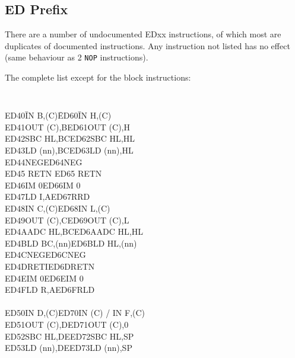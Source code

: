 \documentclass[twoside,openright,a4paper]{book}
\begin{document}
\subsection{ED Prefix \cite{gerton}}

There are a number of undocumented EDxx instructions, of which most are duplicates of documented instructions. Any instruction not listed has no effect (same behaviour as 2 {\tt NOP} instructions).

The complete list except for the block instructions:

\renewcommand{\thefootnote}{\fnsymbol{footnote}}
{}
{\tt 
	\begin{tabbing}
		{\qquad}ED40\quad\=IN B,(C)\qquad\qquad\=ED60\quad\=IN H,(C)\\ 
		{\qquad}ED41\>OUT (C),B\>ED61\>OUT (C),H\\ 
		{\qquad}ED42\>SBC HL,BC\>ED62\>SBC HL,HL\\  
		{\qquad}ED43\>LD (nn),BC\>ED63\>LD (nn),HL\\ 
		{\qquad}ED44\>NEG\>ED64\>NEG{\footnotemark[7]}\\ 
		{\qquad}ED45 \> RETN\> ED65\> RETN{\footnotemark[7]}\\
		{\qquad}ED46\>IM 0\>ED66\>IM 0{\footnotemark[7]}\\
		{\qquad}ED47\>LD I,A\>ED67\>RRD\\
		{\qquad}ED48\>IN C,(C)\>ED68\>IN L,(C)\\
		{\qquad}ED49\>OUT (C),C\>ED69\>OUT (C),L\\
		{\qquad}ED4A\>ADC HL,BC\>ED6A\>ADC HL,HL\\
		{\qquad}ED4B\>LD BC,(nn)\>ED6B\>LD HL,(nn)\\
		{\qquad}ED4C\>NEG{\footnotemark[7]}\>ED6C\>NEG{\footnotemark[7]}\\
		{\qquad}ED4D\>RETI\>ED6D\>RETN\footnotemark[7]\\
		{\qquad}ED4E\>IM 0{\footnotemark[7]}\>ED6E\>IM 0{\footnotemark[7]}\\
		{\qquad}ED4F\>LD R,A\>ED6F\>RLD\\
		{\qquad}\\
		{\qquad}ED50\>IN D,(C)\>ED70\>IN (C) / IN F,(C){\footnotemark[7]}\\
		{\qquad}ED51\>OUT (C),D\>ED71\>OUT (C),0{\footnotemark[7]}\\
		{\qquad}ED52\>SBC HL,DE\>ED72\>SBC HL,SP\\
		{\qquad}ED53\>LD (nn),DE\>ED73\>LD (nn),SP\\

\end{tabbing}}
\end{document}
